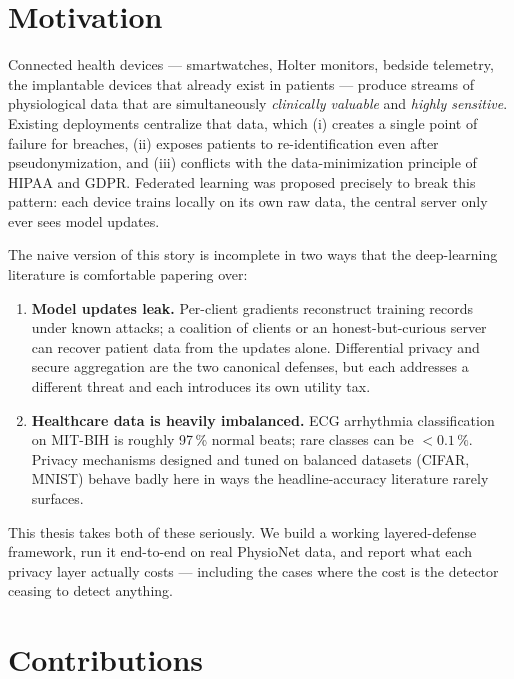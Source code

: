 \documentclass[11pt,a4paper]{report}
\begin{document}
\section{Motivation}

Connected health devices --- smartwatches, Holter monitors, bedside telemetry, the
implantable devices that already exist in patients --- produce streams of
physiological data that are simultaneously \emph{clinically valuable} and
\emph{highly sensitive}. Existing deployments centralize that data, which (i)
creates a single point of failure for breaches, (ii) exposes patients to
re-identification even after pseudonymization, and (iii) conflicts with the
data-minimization principle of HIPAA and GDPR. Federated learning was proposed
\cite{mcmahan2017fedavg} precisely to break this pattern: each device trains
locally on its own raw data, the central server only ever sees model updates.

The naive version of this story is incomplete in two ways that the deep-learning
literature is comfortable papering over:

\begin{enumerate}
  \item \textbf{Model updates leak.} Per-client gradients reconstruct training
  records under known attacks; a coalition of clients or an honest-but-curious
  server can recover patient data from the updates alone. Differential privacy
  \cite{abadi2016dpsgd} and secure aggregation \cite{bonawitz2017secagg} are the
  two canonical defenses, but each addresses a different threat and each
  introduces its own utility tax.
  \item \textbf{Healthcare data is heavily imbalanced.} ECG arrhythmia
  classification on MIT-BIH is roughly 97\,\% normal beats; rare classes can be
  $<\!0.1\,\%$. Privacy mechanisms designed and tuned on balanced datasets
  (CIFAR, MNIST) behave badly here in ways the headline-accuracy literature
  rarely surfaces.
\end{enumerate}

This thesis takes both of these seriously. We build a working layered-defense
framework, run it end-to-end on real PhysioNet data, and report what each
privacy layer actually costs --- including the cases where the cost is the
detector ceasing to detect anything.

\section{Contributions}
\end{document}
